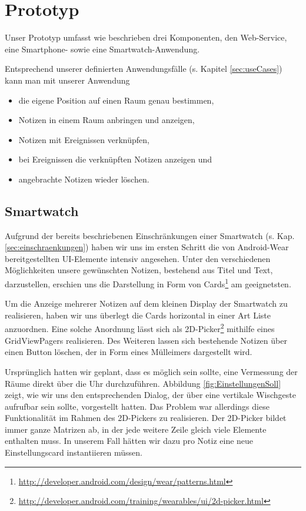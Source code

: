 \section{Prototyp}
\label{sec:prototyp}
Unser Prototyp umfasst wie beschrieben drei Komponenten, den Web-Service, eine Smartphone- sowie eine Smartwatch-Anwendung. 

Entsprechend unserer definierten Anwendungsfälle (s. Kapitel \ref{sec:useCases}) kann man mit unserer Anwendung
\begin{itemize}
\item{die eigene Position auf einen Raum genau bestimmen,}
\item{Notizen in einem Raum anbringen und anzeigen,}
\item{Notizen mit Ereignissen verknüpfen,}
\item{bei Ereignissen die verknüpften Notizen anzeigen und}
\item{angebrachte Notizen wieder löschen.} 
\end{itemize}


\subsection{Smartwatch}
Aufgrund der bereits beschriebenen Einschränkungen einer Smartwatch (s. Kap. \ref{sec:einschraenkungen}) haben wir uns im ersten Schritt die von Android-Wear bereitgestellten UI-Elemente intensiv angesehen. Unter den verschiedenen Möglichkeiten unsere gewünschten Notizen, bestehend aus Titel und Text, darzustellen, erschien uns die Darstellung in Form von Cards\footnote{\url{http://developer.android.com/design/wear/patterns.html}} am geeignetsten.

Um die Anzeige mehrerer Notizen auf dem kleinen Display der Smartwatch zu realisieren, haben wir uns überlegt die Cards horizontal in einer Art Liste anzuordnen. Eine solche Anordnung lässt sich als 2D-Picker\footnote{\url{http://developer.android.com/training/wearables/ui/2d-picker.html}} mithilfe eines GridViewPagers realisieren. Des Weiteren lassen sich bestehende Notizen über einen Button löschen, der in Form eines Mülleimers dargestellt wird.

Ursprünglich hatten wir geplant, dass es möglich sein sollte, eine Vermessung der Räume direkt über die Uhr durchzuführen. Abbildung \ref{fig:EinstellungenSoll} zeigt, wie wir uns den entsprechenden Dialog, der über eine vertikale Wischgeste aufrufbar sein sollte, vorgestellt hatten. Das Problem war allerdings diese Funktionalität im Rahmen des 2D-Pickers zu realisieren. Der 2D-Picker bildet immer ganze Matrizen ab, in der jede weitere Zeile gleich viele Elemente enthalten muss. In unserem Fall hätten wir dazu pro Notiz eine neue Einstellungscard instantiieren müssen.

